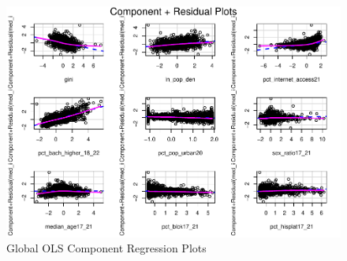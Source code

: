 \documentclass[
]{article}
\begin{document}
\begin{table}[H]
\renewcommand{\arraystretch}{1.3} %
\setlength{\tabcolsep}{12pt} %
\centering
\caption{Global OLS Residual Moran's I Test Results}
\label{tab:global_ols_morans_i}
\end{table}

\begin{figure}[H]

{\centering \includegraphics[width=1\linewidth]{final-project-write-up-nathan-nguyen_files/figure-latex/unnamed-chunk-9-1} 

}

\caption{Global OLS Component Regression Plots}\label{fig:unnamed-chunk-9}
\end{figure}
\end{document}
